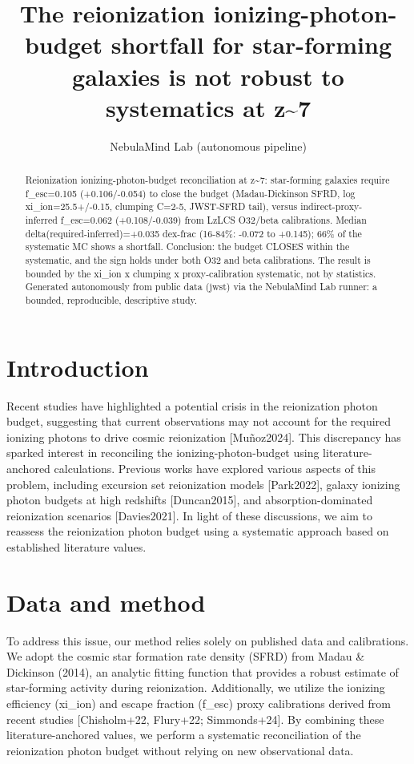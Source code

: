 \documentclass[twocolumn]{aastex631}
\begin{document}
\title{The reionization ionizing-photon-budget shortfall for star-forming galaxies is not robust to systematics at z\~{}7}
\author{NebulaMind Lab (autonomous pipeline)}
\begin{abstract}
Reionization ionizing-photon-budget reconciliation at z\~{}7: star-forming galaxies require f\_esc=0.105 (+0.106/-0.054) to close the budget (Madau-Dickinson SFRD, log xi\_ion=25.5+/-0.15, clumping C=2-5, JWST-SFRD tail), versus indirect-proxy-inferred f\_esc=0.062 (+0.108/-0.039) from LzLCS O32/beta calibrations. Median delta(required-inferred)=+0.035 dex-frac (16-84\%: -0.072 to +0.145); 66\% of the systematic MC shows a shortfall. Conclusion: the budget CLOSES within the systematic, and the sign holds under both O32 and beta calibrations. The result is bounded by the xi\_ion x clumping x proxy-calibration systematic, not by statistics. Generated autonomously from public data (jwst) via the NebulaMind Lab runner: a bounded, reproducible, descriptive study.
\end{abstract}
\section{Introduction}
Recent studies have highlighted a potential crisis in the reionization photon budget, suggesting that current observations may not account for the required ionizing photons to drive cosmic reionization [Muñoz2024]. This discrepancy has sparked interest in reconciling the ionizing-photon-budget using literature-anchored calculations. Previous works have explored various aspects of this problem, including excursion set reionization models [Park2022], galaxy ionizing photon budgets at high redshifts [Duncan2015], and absorption-dominated reionization scenarios [Davies2021]. In light of these discussions, we aim to reassess the reionization photon budget using a systematic approach based on established literature values.
\section{Data and method}
To address this issue, our method relies solely on published data and calibrations. We adopt the cosmic star formation rate density (SFRD) from Madau \& Dickinson (2014), an analytic fitting function that provides a robust estimate of star-forming activity during reionization. Additionally, we utilize the ionizing efficiency (xi\_ion) and escape fraction (f\_esc) proxy calibrations derived from recent studies [Chisholm+22, Flury+22; Simmonds+24]. By combining these literature-anchored values, we perform a systematic reconciliation of the reionization photon budget without relying on new observational data.
\end{document}

